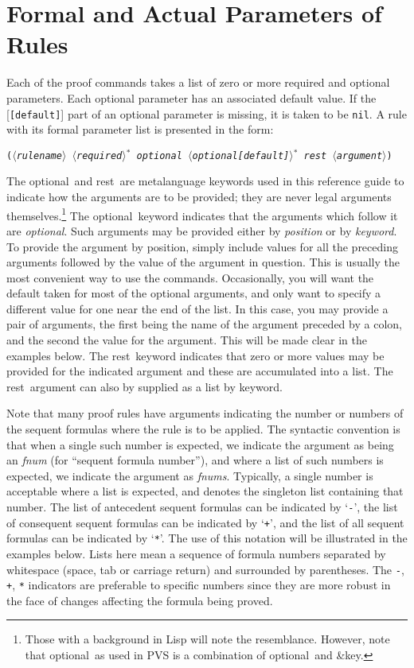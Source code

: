 \documentclass[12pt,twoside]{book}
\def\optl{{\smaller\sc {\smaller\smaller \&}optional}}
\def\rest{{\smaller\sc {\smaller\smaller \&}rest}}
\def\default#1{\textrm{[\texttt{#1}]}}
\def\bkt#1{{$\langle$#1$\rangle$}}
\newcommand{\carg}[1]{\textrm{\emph{#1}}\index{#1}}
\newcommand{\cargdflt}[2]{\carg{#1}\default{#2}}
\begin{document}
\section{Formal and Actual Parameters of Rules}
Each of the proof commands takes a list of zero or more required and
optional parameters.  Each optional parameter has an associated default
value.  If the  \cargdflt{}{[default]} part of an optional parameter is
missing, it is taken to be \texttt{nil}.  A rule with its formal parameter
list is presented in the form:
\begin{center}
  \texttt{(\carg{\bkt{rulename} \bkt{required}$^{\textstyle *}$
        \optl\ \bkt{\textrm{\emph{optional}}\default{default}}$^{\textstyle *}$
        \rest\ \bkt{argument}})}
\end{center}
The \optl\ and \rest\ are metalanguage keywords used in this reference
guide to indicate how the arguments are to 
be provided; they are never legal arguments themselves.\footnote{Those
with a background in Lisp will note the resemblance.  However, note that
\optl\ as used in PVS is a combination of \optl\ and {{\smaller\sc
{\smaller\smaller \&}key}}.} The \optl\ keyword indicates that the
arguments which follow it are \emph{optional}.  Such arguments may be
provided either by \emph{position} or by \emph{keyword}.  To provide
the argument by position, simply include values for all the preceding
arguments followed by the value of the argument in question.  This is
usually the most convenient way to use the commands.  Occasionally, you
will want the default taken for most of the optional arguments, and only
want to specify a different value for one near the end of the list.  In
this case, you may provide a pair of arguments, the first being the name
of the argument preceded by a colon, and the second the value for the
argument.  This will be made clear in the examples below.  The \rest\
keyword indicates that zero or more values may be provided for the
indicated argument and these are accumulated into a list.  The \rest\
argument can also by supplied as a list by keyword.  

Note that many proof rules have arguments indicating the number or numbers
of the sequent formulas where the rule is to be applied.  The syntactic
convention is that when a single such number is expected, we indicate the
argument as being an \emph{fnum} (for ``sequent formula number''), and
where a list of such numbers is expected, we indicate the argument as
\emph{fnums}.  Typically, a single number is acceptable where a list is
expected, and denotes the singleton list containing that number.  The list
of antecedent sequent formulas can be indicated by `\texttt{-}', the list
of consequent sequent formulas can be indicated by `\texttt{+}', and the
list of all sequent formulas can be indicated by `\texttt{*}'.  The use of
this notation will be illustrated in the examples below.  Lists here mean
a sequence of formula numbers separated by whitespace (space, tab or
carriage return) and surrounded by parentheses.  The \texttt{-},
\texttt{+}, \texttt{*} indicators are preferable to specific numbers since
they are more robust in the face of changes affecting the formula being
proved.
\end{document}
